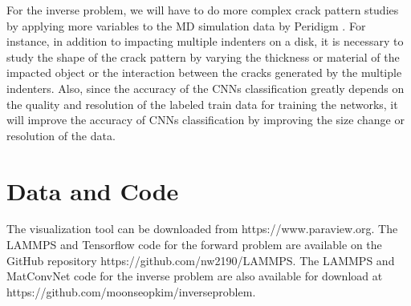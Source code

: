 For the inverse problem, we will have to do more complex crack pattern studies by applying more variables to the MD simulation data by Peridigm \cite{Ref30}. For instance, in addition to impacting multiple indenters on a disk, it is necessary to study the shape of the crack pattern by varying the thickness or material of the impacted object or the interaction between the cracks generated by the multiple indenters. Also, since the accuracy of the CNNs classification greatly depends on the quality and resolution of the labeled train data for training the networks, it will improve the accuracy of CNNs classification by improving the size change or resolution of the data. 


\section{Data and Code}
\label{sec:6}
The visualization tool can be downloaded from https://www.paraview.org.
The LAMMPS and Tensorflow code for the forward problem are available on the GitHub repository  https://github.com/nw2190/LAMMPS.
The LAMMPS and MatConvNet code for the inverse problem are also available for download at  https://github.com/moonseopkim/inverseproblem.



%
%




